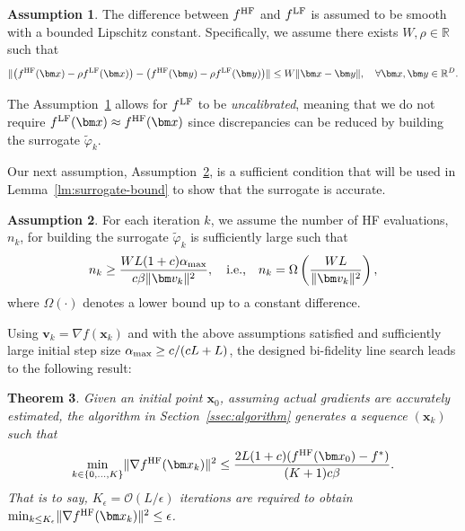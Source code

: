 \documentclass[10pt]{article} %
\numberwithin{equation}{section}
\theoremstyle{plain}
\newtheorem{theorem}{Theorem} \numberwithin{theorem}{section}
\theoremstyle{definition}
\newtheorem{assumption}[theorem]{Assumption}
\newcommand{\<}{\langle}
\renewcommand{\>}{\rangle}
\renewcommand{\(}{\left(}
\renewcommand{\)}{\right)}
\renewcommand{\[}{\left[}
\renewcommand{\]}{\right]}
\def\R{{\mathbb R}}
\def\R{{\mathbb R}}
\newcommand{\HF}{\textup{HF}}
\newcommand{\LF}{\textup{LF}}
\newcommand{\alphaMax}{\alpha_\textup{max}}
\newcommand{\Lip}{L}
\begin{document}
\begin{assumption}
\label{asp:lipschitz}
    The difference between $f^\HF$ and $f^\LF$ is assumed to be smooth with a bounded Lipschitz constant. Specifically, we assume there exists $W, \rho\in \R$ such that
    \begin{equation}
        \lVert \left(f^\HF(\bm x) - \rho f^\LF(\bm x)\right) - \left(f^\HF(\bm y) - \rho f^\LF(\bm y)\right) \rVert \leq W\lVert \bm x - \bm y\rVert, \quad\forall \bm x, \bm y\in\R^D.
    \end{equation}
\end{assumption}
The Assumption~\ref{asp:lipschitz} allows for $f^\LF$ to be \emph{uncalibrated}, meaning that we do not require $f^\LF(\bm x)\approx f^\HF(\bm x)$ since discrepancies can be reduced by building the surrogate $\tilde{\varphi}_k$.  

Our next assumption, Assumption~\ref{asp:nk-bound}, is a sufficient condition that will be used in Lemma~\ref{lm:surrogate-bound} to show that the surrogate is accurate.

\begin{assumption}
\label{asp:nk-bound}
    For each iteration $k$, we assume the number of HF evaluations, $n_k$, for building the surrogate $\tilde{\varphi}_k$ is sufficiently large such that \begin{equation}
    \label{eq:nk-bound}
        n_k \ge \frac{W\Lip(1+c)\alphaMax}{c\beta\lVert\bm v_k\rVert^2}, \quad \text{i.e.,}\quad 
        n_k =\Omega \left(\frac{WL}{\lVert \bm v_k\rVert^2}\right),
    \end{equation}
    where $\Omega(\cdot)$ denotes a lower bound up to a constant difference.
\end{assumption}

Using $\bm v_k = \nabla f(\bm x_k)$ and with the above assumptions satisfied and sufficiently large initial step size $\alphaMax\geq c/(c\Lip+\Lip)$, the designed bi-fidelity line search leads to the following result:
\begin{theorem}
\label{thm:convergence}
    Given an initial point $\bm x_0$, assuming actual gradients are accurately estimated, the algorithm in Section~\ref{ssec:algorithm} generates a sequence $(\bm x_k)$ such that  
    \begin{equation}
        \min_{k\in\{0, \dots, K\}} \lVert \nabla f^\HF(\bm x_k)\rVert^2 \leq \frac{2\Lip(1+c)(f^\HF(\bm x_0) - f^\ast)}{(K + 1)c\beta}.
    \end{equation}
    That is to say, $K_\epsilon = \mathcal{O}(\Lip/\epsilon)$ iterations are required to obtain $\min_{k\le K_\epsilon} \lVert \nabla f^\HF(\bm x_k)\rVert^2\leq \epsilon$.
\end{theorem}
\end{document}
